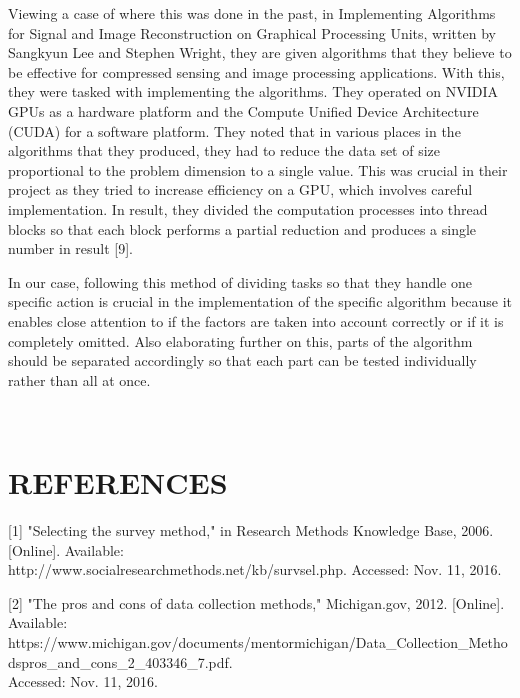 \documentclass[a4,draftclsnofoot,onecolumn,margin=0.75,10pt]{IEEEtran}
\begin{document}
{   Viewing a case of where this was done in the past, in Implementing Algorithms for Signal and Image Reconstruction on Graphical Processing Units, written by Sangkyun Lee and Stephen Wright, they are given algorithms that they believe to be effective for compressed sensing and image processing applications. With this, they were tasked with implementing the algorithms. They operated on NVIDIA GPUs as a hardware platform and the Compute Unified Device Architecture (CUDA) for a software platform. They noted that in various places in the algorithms that they produced, they had to reduce the data set of size proportional to the problem dimension to a single value. This was crucial in their project as they tried to increase efficiency on a GPU, which involves careful implementation. In result, they divided the computation processes into thread blocks so that each block performs a partial reduction and produces a single number in result [9]. 
   
   In our case, following this method of dividing tasks so that they handle one specific action is crucial in the implementation of the specific algorithm because it enables close attention to if the factors are taken into account correctly or if it is completely omitted. Also elaborating further on this, parts of the algorithm should be separated accordingly so that each part can be tested individually rather than all at once.}

\bigskip

\bigskip

\bigskip


\bigskip


\clearpage\
\section[REFERENCES{}]
{\rmfamily\bfseries\color{black}
REFERENCES}

[1]	"Selecting the survey method," in Research Methods Knowledge Base, 2006. [Online]. Available:\\ http://www.socialresearchmethods.net/kb/survsel.php. Accessed: Nov. 11, 2016.
\par\null\par

[2]	"The pros and cons of data collection methods," Michigan.gov, 2012. [Online]. Available:\\ https://www.michigan.gov/documents/mentormichigan/Data\_Collection\_Methods\-\-pros\_and\_cons\_2\_403346\_7.pdf.\\ Accessed: Nov. 11, 2016.
\par\null\par
\end{document}
